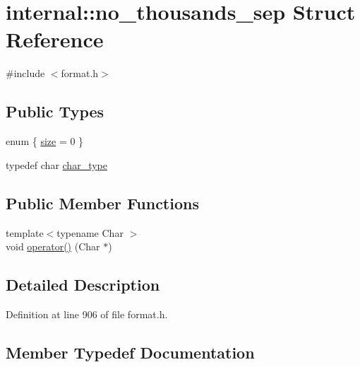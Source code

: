 \hypertarget{structinternal_1_1no__thousands__sep}{}\section{internal\+:\+:no\+\_\+thousands\+\_\+sep Struct Reference}
\label{structinternal_1_1no__thousands__sep}


{\ttfamily \#include $<$format.\+h$>$}

\subsection*{Public Types}
\begin{DoxyCompactItemize}
\item 
enum \{ \hyperlink{structinternal_1_1no__thousands__sep_a4f9f8b52aa954618eab526dbf2d7c461ab59a66813dc5be02761295636420ca1b}{size} = 0
 \}
\item 
typedef char \hyperlink{structinternal_1_1no__thousands__sep_a9b6389cef050e5086086d7fb75b0f482}{char\+\_\+type}
\end{DoxyCompactItemize}
\subsection*{Public Member Functions}
\begin{DoxyCompactItemize}
\item 
{\footnotesize template$<$typename Char $>$ }\\void \hyperlink{structinternal_1_1no__thousands__sep_a2813f32ecaa85d5dcd0719a30b9a7775}{operator()} (Char $\ast$)
\end{DoxyCompactItemize}


\subsection{Detailed Description}


Definition at line 906 of file format.\+h.



\subsection{Member Typedef Documentation}
\mbox{\label{structinternal_1_1no__thousands__sep_a9b6389cef050e5086086d7fb75b0f482}} 
